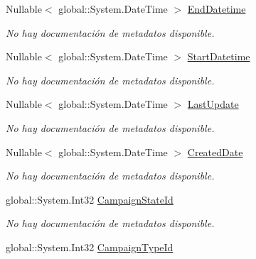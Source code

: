 \begin{DoxyCompactItemize}
Nullable$<$ global\-::\-System.\-Date\-Time $>$ \hyperlink{class_game_memory_1_1_advert_campaigns_a049a795b17f180045f49fabc2d826fe5}{End\-Datetime}
\begin{DoxyCompactList}\small\item\em No hay documentación de metadatos disponible. \end{DoxyCompactList}\item 
Nullable$<$ global\-::\-System.\-Date\-Time $>$ \hyperlink{class_game_memory_1_1_advert_campaigns_a97c112e92c8edbcc4fa00ed2573de907}{Start\-Datetime}
\begin{DoxyCompactList}\small\item\em No hay documentación de metadatos disponible. \end{DoxyCompactList}\item 
Nullable$<$ global\-::\-System.\-Date\-Time $>$ \hyperlink{class_game_memory_1_1_advert_campaigns_ac344d89b4ad8fb19599f44c9fa915241}{Last\-Update}
\begin{DoxyCompactList}\small\item\em No hay documentación de metadatos disponible. \end{DoxyCompactList}\item 
Nullable$<$ global\-::\-System.\-Date\-Time $>$ \hyperlink{class_game_memory_1_1_advert_campaigns_a2a4e8304035a50ff877a6486d60a9e3e}{Created\-Date}
\begin{DoxyCompactList}\small\item\em No hay documentación de metadatos disponible. \end{DoxyCompactList}\item 
global\-::\-System.\-Int32 \hyperlink{class_game_memory_1_1_advert_campaigns_aaeb4c0190abc0c16f835d17371cb8449}{Campaign\-State\-Id}
\begin{DoxyCompactList}\small\item\em No hay documentación de metadatos disponible. \end{DoxyCompactList}\item 
global\-::\-System.\-Int32 \hyperlink{class_game_memory_1_1_advert_campaigns_a8ea07608b924d2ab48832ead8bd743a1}{Campaign\-Type\-Id}

\end{DoxyCompactItemize}
